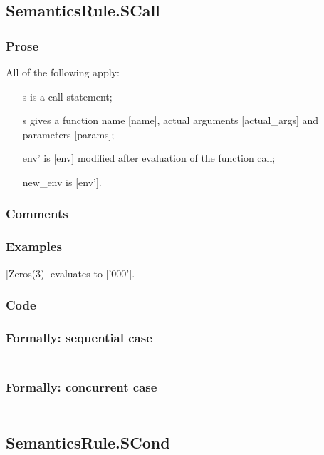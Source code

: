 \documentclass{book}
\begin{document}
\subsection{SemanticsRule.SCall \label{sec:SemanticsRule.SCall}}

    \subsubsection{Prose}
    All of the following apply:
    \begin{itemize}
    \item [s] is a call statement;
    \item [s] gives a function name [name], actual arguments [actual\_args] and
      parameters [params];
    \item [env'] is [env] modified after evaluation of the function call;
    \item [new\_env] is [env'].
    \end{itemize}

    \subsubsection{Comments}

    \subsubsection{Examples}
    [Zeros(3)] evaluates to ['000'].

  \subsubsection{Code}

  \subsubsection{Formally: sequential case}
  \begin{align}
  \end{align} 

  \subsubsection{Formally: concurrent case}
  \begin{align}
  \end{align} 

\subsection{SemanticsRule.SCond \label{sec:SemanticsRule.SCond}}
\end{document}
